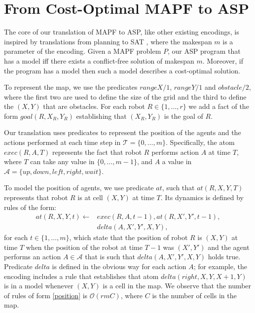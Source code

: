 \newcommand{\Up}{\ensuremath{\mathit{up}}}
\newcommand{\Down}{\ensuremath{\mathit{down}}}
\newcommand{\Left}{\ensuremath{\mathit{left}}}
\newcommand{\Right}{\ensuremath{\mathit{right}}}
\newcommand{\Wait}{\ensuremath{\mathit{wait}}}


\section{From Cost-Optimal MAPF to ASP}
The core of our translation of MAPF to ASP, like other existing encodings, is inspired by translations from planning to SAT \cite{}, where the makespan $m$ is a parameter of the encoding. Given a MAPF problem $P$, our ASP program that has a model iff there exists a conflict-free solution of makespan $m$. Moreover, if the program has a model then such a model describes a cost-optimal solution.

To represent the map, we use the predicates $rangeX/1$, $rangeY/1$ and $obstacle/2$, where the first two are used to define the size of the grid and the third to define the $(X,Y)$ that are obstacles. For each robot $R\in\{1,\ldots,r\}$ we add a fact of the form $goal(R,X_R,Y_R)$ establishing that $(X_R,Y_R)$ is the goal of $R$.

Our translation uses predicates to represent the position of the agents and the actions performed at each time step in $\mathcal{T}=\{0,\ldots,m\}$. Specifically, the atom $exec(R,A,T)$ represents the fact that robot $R$ performs action $A$ at time $T$, where $T$ can take any value in $\{0,\ldots,m-1\}$, and $A$ a value in $\mathcal{A}=\{\Up,\Down,\Left,\Right,\Wait\}$.

To model the position of agents, we use predicate $at$, such that $at(R,X,Y,T)$ represents that robot $R$ is at cell $(X,Y)$ at time $T$. Its dynamics is defined by rules of the form:
\begin{equation}
\begin{split}
at(R,X,Y,t) \leftarrow &exec(R,A,t-1),at(R,X',Y',t-1), \\&delta(A,X',Y',X,Y), \label{position}
\end{split}
\end{equation}
for each $t\in\{1,\ldots,m\}$, which state that the position of robot $R$ is $(X,Y)$ at time $T$ when the position of the robot at time $T-1$ was $(X',Y')$ and the agent performs an action $A\in\mathcal{A}$ that is such that $delta(A,X',Y',X,Y)$ holds true. Predicate $delta$ is defined in the obvious way for each action $A$; for example, the encoding includes a rule that establishes that atom $delta(\Right,X,Y,X+1,Y)$ is in a model whenever $(X,Y)$ is a cell in the map. We observe that the number of rules of form \eqref{position} is $\mathcal{O}(rmC)$, where $C$ is the number of cells in the map.

